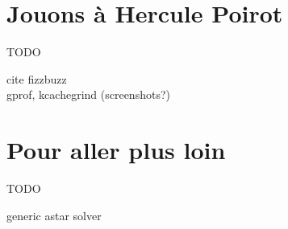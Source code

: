 \documentclass[french]{article}
\begin{document}
\part{Jouons à Hercule Poirot}

{\Huge TODO}

cite fizzbuzz\\
gprof, kcachegrind (screenshots?)

\part{Pour aller plus loin}

{\Huge TODO}

generic astar solver

\printbibliography%
\end{document}
